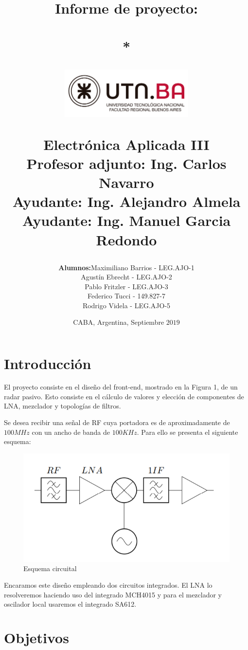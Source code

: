 \documentclass{article}
\author{\begin{tabular}{rl}
  \textbf{Alumnos:} & Maximiliano Barrios - {LEG.AJO-1} \\ & Agustín Ebrecht - {LEG.AJO-2} \\ & Pablo Fritzler - {LEG.AJO-3} \\ & Federico Tucci - {149.827-7} \\ & Rodrigo Videla - {LEG.AJO-5}
\end{tabular}}
\title{{\Huge \textbf{Informe de proyecto:}}\\\vspace{10px}{Proyecto de Laboratorio}\\*
\begin{figure}[h]
\centering
\vspace{20px}
\includegraphics[width=0.6\textwidth]{UTN}
\end{figure} 
\vspace{20px}
Electrónica Aplicada III\\[0.5cm] 
\vspace{25px}
Profesor adjunto: Ing. Carlos Navarro\\
Ayudante: Ing. Alejandro Almela\\
Ayudante: Ing. Manuel Garcia Redondo
\vspace{25px}
\date{\vspace{40px}CABA, Argentina, Septiembre $2019$}
}
\begin{document}
\maketitle
\thispagestyle{empty}

\onecolumn
\tableofcontents{}
\thispagestyle{empty}
\clearpage
\newpage 

\setcounter{page}{1}

\section{Introducción}

El proyecto consiste en el diseño del front-end, mostrado en la Figura 1, de un radar pasivo. Esto consiste en el cálculo de valores y elección de componentes de LNA, mezclador y topologías de filtros.

Se desea recibir una señal de RF cuya portadora es de aproximadamente de $100 MHz$ con un ancho de banda de $100 KHz$. Para ello se presenta el siguiente esquema:

\begin{figure}[H]
  \centering
    \includegraphics[scale=0.7]{esquema_circuital}
  \caption{Esquema circuital}
\end{figure}

Encaramos este diseño empleando dos circuitos integrados. El LNA lo resolveremos haciendo uso del integrado MCH4015 y para el mezclador y oscilador local usaremos el integrado SA612.

\section{Objetivos}
\end{document}

